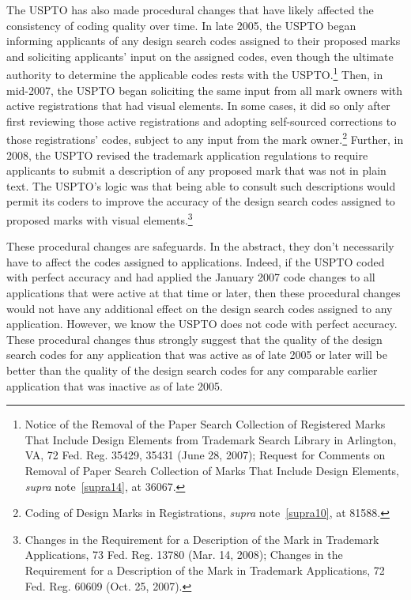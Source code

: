 \documentclass[letterpaper, 11pt, oneside]{article}
\begin{document}
\begin{enumerate}
The USPTO has also made procedural changes that have likely affected the consistency of coding quality over time. In late 2005, the USPTO began informing applicants of any design search codes assigned to their proposed marks and soliciting applicants' input on the assigned codes, even though the ultimate authority to determine the applicable codes rests with the USPTO.\footnote{\label{supra27} Notice of the Removal of the Paper Search Collection of Registered Marks That Include Design Elements from Trademark Search Library in Arlington, VA, 72 Fed. Reg. 35429, 35431 (June 28, 2007); Request for Comments on Removal of Paper Search Collection of Marks That Include Design Elements, \textit{supra} note~\ref{supra14}, at 36067.} Then, in mid-2007, the USPTO began soliciting the same input from all mark owners with active registrations that had visual elements. In some cases, it did so only after first reviewing those active registrations and adopting self-sourced corrections to those registrations' codes, subject to any input from the mark owner.\footnote{Coding of Design Marks in Registrations, \textit{supra} note~\ref{supra10}, at 81588.} Further, in 2008, the USPTO revised the trademark application regulations to require applicants to submit a description of any proposed mark that was not in plain text. The USPTO's logic was that being able to consult such descriptions would permit its coders to improve the accuracy of the design search codes assigned to proposed marks with visual elements.\footnote{Changes in the Requirement for a Description of the Mark in Trademark Applications, 73 Fed. Reg. 13780 (Mar. 14, 2008); Changes in the Requirement for a Description of the Mark in Trademark Applications, 72 Fed. Reg. 60609 (Oct. 25, 2007).}

These procedural changes are safeguards. In the abstract, they don't necessarily have to affect the codes assigned to applications. Indeed, if the USPTO coded with perfect accuracy and had applied the January 2007 code changes to all applications that were active at that time or later, then these procedural changes would not have any additional effect on the design search codes assigned to any application. However, we know the USPTO does not code with perfect accuracy. These procedural changes thus strongly suggest that the quality of the design search codes for any application that was active as of late 2005 or later will be better than the quality of the design search codes for any comparable earlier application that was inactive as of late 2005.

\end{enumerate}
\end{document}
